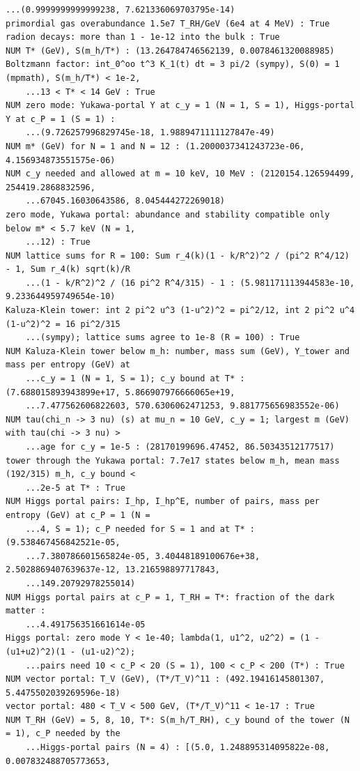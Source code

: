 \documentclass[10pt,a4paper]{article}
\begin{document}
\begin{Verbatim}[fontsize=\small,frame=single,framesep=2mm]
    ...(0.9999999999999238, 7.621336069703795e-14)
primordial gas overabundance 1.5e7 T_RH/GeV (6e4 at 4 MeV) : True
radion decays: more than 1 - 1e-12 into the bulk : True
NUM T* (GeV), S(m_h/T*) : (13.264784746562139, 0.0078461320088985)
Boltzmann factor: int_0^oo t^3 K_1(t) dt = 3 pi/2 (sympy), S(0) = 1 (mpmath), S(m_h/T*) < 1e-2,
    ...13 < T* < 14 GeV : True
NUM zero mode: Yukawa-portal Y at c_y = 1 (N = 1, S = 1), Higgs-portal Y at c_P = 1 (S = 1) :
    ...(9.726257996829745e-18, 1.9889471111127847e-49)
NUM m* (GeV) for N = 1 and N = 12 : (1.2000037341243723e-06, 4.156934873551575e-06)
NUM c_y needed and allowed at m = 10 keV, 10 MeV : (2120154.126594499, 254419.2868832596,
    ...67045.16030643586, 8.045444272269018)
zero mode, Yukawa portal: abundance and stability compatible only below m* < 5.7 keV (N = 1,
    ...12) : True
NUM lattice sums for R = 100: Sum r_4(k)(1 - k/R^2)^2 / (pi^2 R^4/12) - 1, Sum r_4(k) sqrt(k)/R
    ...(1 - k/R^2)^2 / (16 pi^2 R^4/315) - 1 : (5.981171113944583e-10, 9.233644959749654e-10)
Kaluza-Klein tower: int 2 pi^2 u^3 (1-u^2)^2 = pi^2/12, int 2 pi^2 u^4 (1-u^2)^2 = 16 pi^2/315
    ...(sympy); lattice sums agree to 1e-8 (R = 100) : True
NUM Kaluza-Klein tower below m_h: number, mass sum (GeV), Y_tower and mass per entropy (GeV) at
    ...c_y = 1 (N = 1, S = 1); c_y bound at T* : (7.688015893943899e+17, 5.866907976666065e+19,
    ...7.477562606822603, 570.6306062471253, 9.881775656983552e-06)
NUM tau(chi_n -> 3 nu) (s) at mu_n = 10 GeV, c_y = 1; largest m (GeV) with tau(chi -> 3 nu) >
    ...age for c_y = 1e-5 : (28170199696.47452, 86.50343512177517)
tower through the Yukawa portal: 7.7e17 states below m_h, mean mass (192/315) m_h, c_y bound <
    ...2e-5 at T* : True
NUM Higgs portal pairs: I_hp, I_hp^E, number of pairs, mass per entropy (GeV) at c_P = 1 (N =
    ...4, S = 1); c_P needed for S = 1 and at T* : (9.538467456842521e-05,
    ...7.380786601565824e-05, 3.40448189100676e+38, 2.5028869407639637e-12, 13.216598897717843,
    ...149.20792978255014)
NUM Higgs portal pairs at c_P = 1, T_RH = T*: fraction of the dark matter :
    ...4.491756351661614e-05
Higgs portal: zero mode Y < 1e-40; lambda(1, u1^2, u2^2) = (1 - (u1+u2)^2)(1 - (u1-u2)^2);
    ...pairs need 10 < c_P < 20 (S = 1), 100 < c_P < 200 (T*) : True
NUM vector portal: T_V (GeV), (T*/T_V)^11 : (492.19416145801307, 5.4475502039269596e-18)
vector portal: 480 < T_V < 500 GeV, (T*/T_V)^11 < 1e-17 : True
NUM T_RH (GeV) = 5, 8, 10, T*: S(m_h/T_RH), c_y bound of the tower (N = 1), c_P needed by the
    ...Higgs-portal pairs (N = 4) : [(5.0, 1.248895314095822e-08, 0.007832488705773653,

\end{Verbatim}
\end{document}
